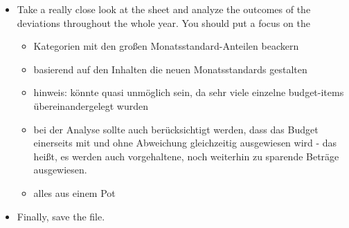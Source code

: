 \begin{itemize}
	\item Take a really close look at the  sheet and analyze the outcomes of the deviations throughout the whole year.
	You should put a focus on the 
	\begin{itemize}
		\item Kategorien mit den großen Monatsstandard-Anteilen beackern
		\item basierend auf den Inhalten die neuen Monatsstandards gestalten
		\item hinweis: könnte quasi unmöglich sein, da sehr viele einzelne budget-items übereinandergelegt wurden
		\item bei der Analyse sollte auch berücksichtigt werden, dass das Budget einerseits mit und ohne Abweichung gleichzeitig ausgewiesen wird - das heißt, es werden auch vorgehaltene, noch weiterhin zu sparende Beträge ausgewiesen.
		\item alles aus einem Pot
	\end{itemize}	
	\item Finally, save the file.	
\end{itemize}